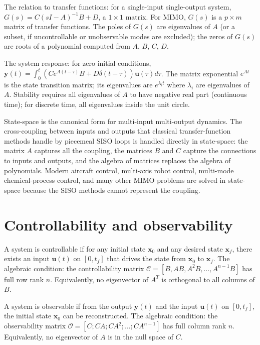 The relation to transfer functions: for a single-input single-output system, $G(s) = C(sI - A)^{-1} B + D$, a $1 \times 1$ matrix. For MIMO, $G(s)$ is a $p \times m$ matrix of transfer functions. The poles of $G(s)$ are eigenvalues of $A$ (or a subset, if uncontrollable or unobservable modes are excluded); the zeros of $G(s)$ are roots of a polynomial computed from $A$, $B$, $C$, $D$.

The system response: for zero initial conditions, $\mathbf{y}(t) = \int_0^t (C e^{A(t-\tau)} B + D \delta(t-\tau)) \mathbf{u}(\tau) d\tau$. The matrix exponential $e^{At}$ is the state transition matrix; its eigenvalues are $e^{\lambda_i t}$ where $\lambda_i$ are eigenvalues of $A$. Stability requires all eigenvalues of $A$ to have negative real part (continuous time); for discrete time, all eigenvalues inside the unit circle.

\begin{archetype}
State-space is the canonical form for multi-input multi-output dynamics. The cross-coupling between inputs and outputs that classical transfer-function methods handle by piecemeal SISO loops is handled directly in state-space: the matrix $A$ captures all the coupling, the matrices $B$ and $C$ capture the connections to inputs and outputs, and the algebra of matrices replaces the algebra of polynomials. Modern aircraft control, multi-axis robot control, multi-mode chemical-process control, and many other MIMO problems are solved in state-space because the SISO methods cannot represent the coupling.
\end{archetype}

\section{Controllability and observability}

A system is controllable if for any initial state $\mathbf{x}_0$ and any desired state $\mathbf{x}_f$, there exists an input $\mathbf{u}(t)$ on $[0, t_f]$ that drives the state from $\mathbf{x}_0$ to $\mathbf{x}_f$. The algebraic condition: the controllability matrix $\mathcal{C} = [B, AB, A^2B, \ldots, A^{n-1}B]$ has full row rank $n$. Equivalently, no eigenvector of $A^T$ is orthogonal to all columns of $B$.

A system is observable if from the output $\mathbf{y}(t)$ and the input $\mathbf{u}(t)$ on $[0, t_f]$, the initial state $\mathbf{x}_0$ can be reconstructed. The algebraic condition: the observability matrix $\mathcal{O} = [C; CA; CA^2; \ldots; CA^{n-1}]$ has full column rank $n$. Equivalently, no eigenvector of $A$ is in the null space of $C$.

